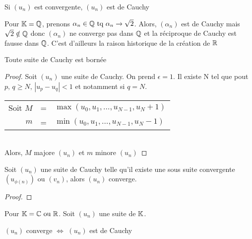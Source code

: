 \prop
Si $(u_n)$ est convergente, $(u_n)$ est de Cauchy

\begin{rem}
Pour $\mathbb{K}=\mathbb{Q}$, prenons $\alpha_n\in\mathbb{Q}\text{~tq~}\alpha_n\to\sqrt{2}$. Alors, $(\alpha_n)$ est de Cauchy mais $\sqrt{2}\notin\mathbb{Q}$ donc $(\alpha_n)$ ne converge pas dans $\mathbb{Q}$ et la réciproque de Cauchy est fausse dans $\mathbb{Q}$. C'est d'ailleurs la raison historique de la création de $\mathbb{R}$
\end{rem}

\lem
Toute suite de Cauchy est bornée

\begin{proof}
Soit $(u_n)$ une suite de Cauchy. On prend $\epsilon=1$. Il existe N tel que pout $p,\,q\geq N,\,|u_p-u_q|<1$ et notamment si $q=N$.

\begin{tabular}{rcl}
Soit $M$&=&$\max(u_0,u_1,\ldots,u_{N-1},u_N+1)$\\
	$m$&=&$\min(u_0,u_1,\ldots,u_{N-1},u_N-1)$\\
\end{tabular}\\
Alors, $M$ majore $(u_n)$ et $m$ minore $(u_n)$
\end{proof}

\lem
Soit $(u_n)$ une suite de Cauchy telle qu'il existe une sous suite convergente $(u_{\phi(n)})$ ou $(v_n)$, alors $(u_n)$ converge.

\begin{proof}

\end{proof}

Pour $\mathbb{K} = \mathbb{C}\text{~ou~}\mathbb{R}$. Soit $(u_n)$ une suite de $\mathbb{K}$.\\
\begin{center}
	$(u_n)$ converge $\Leftrightarrow$ $(u_n)$ est de Cauchy
\end{center}
